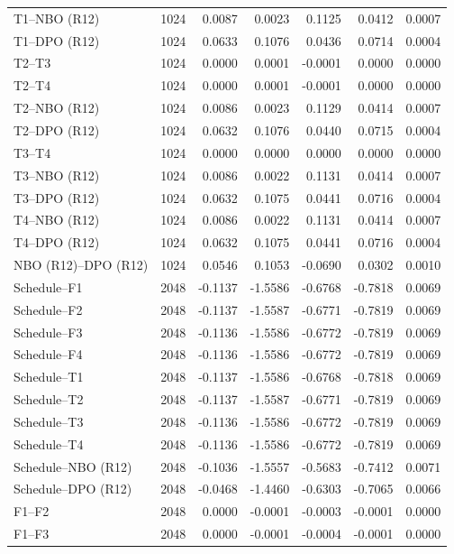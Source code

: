\begin{longtable}{lrrrrrr}
T1--NBO (R12) & 1024 & 0.0087 & 0.0023 & 0.1125 & 0.0412 & 0.0007 \\
T1--DPO (R12) & 1024 & 0.0633 & 0.1076 & 0.0436 & 0.0714 & 0.0004 \\
T2--T3 & 1024 & 0.0000 & 0.0001 & -0.0001 & 0.0000 & 0.0000 \\
T2--T4 & 1024 & 0.0000 & 0.0001 & -0.0001 & 0.0000 & 0.0000 \\
T2--NBO (R12) & 1024 & 0.0086 & 0.0023 & 0.1129 & 0.0414 & 0.0007 \\
T2--DPO (R12) & 1024 & 0.0632 & 0.1076 & 0.0440 & 0.0715 & 0.0004 \\
T3--T4 & 1024 & 0.0000 & 0.0000 & 0.0000 & 0.0000 & 0.0000 \\
T3--NBO (R12) & 1024 & 0.0086 & 0.0022 & 0.1131 & 0.0414 & 0.0007 \\
T3--DPO (R12) & 1024 & 0.0632 & 0.1075 & 0.0441 & 0.0716 & 0.0004 \\
T4--NBO (R12) & 1024 & 0.0086 & 0.0022 & 0.1131 & 0.0414 & 0.0007 \\
T4--DPO (R12) & 1024 & 0.0632 & 0.1075 & 0.0441 & 0.0716 & 0.0004 \\
NBO (R12)--DPO (R12) & 1024 & 0.0546 & 0.1053 & -0.0690 & 0.0302 & 0.0010 \\
Schedule--F1 & 2048 & -0.1137 & -1.5586 & -0.6768 & -0.7818 & 0.0069 \\
Schedule--F2 & 2048 & -0.1137 & -1.5587 & -0.6771 & -0.7819 & 0.0069 \\
Schedule--F3 & 2048 & -0.1136 & -1.5586 & -0.6772 & -0.7819 & 0.0069 \\
Schedule--F4 & 2048 & -0.1136 & -1.5586 & -0.6772 & -0.7819 & 0.0069 \\
Schedule--T1 & 2048 & -0.1137 & -1.5586 & -0.6768 & -0.7818 & 0.0069 \\
Schedule--T2 & 2048 & -0.1137 & -1.5587 & -0.6771 & -0.7819 & 0.0069 \\
Schedule--T3 & 2048 & -0.1136 & -1.5586 & -0.6772 & -0.7819 & 0.0069 \\
Schedule--T4 & 2048 & -0.1136 & -1.5586 & -0.6772 & -0.7819 & 0.0069 \\
Schedule--NBO (R12) & 2048 & -0.1036 & -1.5557 & -0.5683 & -0.7412 & 0.0071 \\
Schedule--DPO (R12) & 2048 & -0.0468 & -1.4460 & -0.6303 & -0.7065 & 0.0066 \\
F1--F2 & 2048 & 0.0000 & -0.0001 & -0.0003 & -0.0001 & 0.0000 \\
F1--F3 & 2048 & 0.0000 & -0.0001 & -0.0004 & -0.0001 & 0.0000 \\

\end{longtable}
